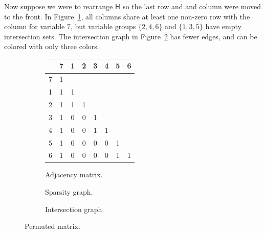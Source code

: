 \documentclass[article]{jss}\usepackage[]{graphicx}\usepackage[]{color}
\newcommand{\hess}[2]{\mathsf{H}_{#1}#2}
\begin{document}
Now suppose we were to rearrange $\hess{}{}$ so the last row and
and column were moved to the front.  In Figure~\ref{fig:graph2adj}, all columns share at least one non-zero row with
the column for variable 7, but variable groups $\{2,4,6\}$ and
$\{1,3,5\}$ have empty intersection sets.  The intersection graph in
Figure~\ref{fig:graph2pic} has fewer edges, and can be colored
with only three colors.
\begin{figure}[ptb]
  \begin{subfigure}[m]{.32\textwidth}\centering
  \begin{tabular}{r|ccccccc}
   & 7&1&2&3&4&5&6\\
    \hline
    7& 1&&&&&&\\
    1&1&1&&&&&\\
    2&1&1&1&&&&\\
    3&1&0&0&1&&&\\
    4&1&0&0&1&1&&\\
    5&1&0&0&0&0&1&\\
    6&1&0&0&0&0&1&1
  \end{tabular}
  \caption{Adjacency matrix.}\label{fig:graph2adj}
\end{subfigure}
\begin{subfigure}[m]{.32\textwidth}\centering
\iftoggle{tikz}{
\begin{tikzpicture}
\tikzstyle{every node}=[draw, shape=circle]
\node at (0,0) [fill=green!20] (v7) {7};
\node at (0:1) [fill=blue!20] (v1) {1};
\node at (60:1) [fill=red!20] (v2) {2};
\node at (120:1) [fill=blue!20] (v3) {3};
\node at (180:1) [fill=red!20] (v4) {4};
\node at (240:1) [fill=blue!20] (v5) {5};
\node at (300:1) [fill=red!20] (v6) {6};
\draw
(v1) -- (v7)  (v2) -- (v7)  (v3) -- (v7)
(v4) -- (v7)  (v5) -- (v7)  (v6) -- (v7)
(v1) -- (v2)  (v3) -- (v4)  (v5) -- (v6);
\end{tikzpicture}
}{} %
\caption{Sparsity graph.}\label{fig:graph2pic}
\end{subfigure}
\begin{subfigure}[m]{.32\textwidth}\centering
\iftoggle{tikz}{
\begin{tikzpicture}
\tikzstyle{every node}=[draw, shape=circle]
\node at (0,0) [fill=green!20] (v7) {7};
\node at (0:1) [fill=blue!20] (v1) {1};
\node at (60:1) [fill=red!20] (v2) {2};
\node at (120:1) [fill=blue!20] (v3) {3};
\node at (180:1) [fill=red!20] (v4) {4};
\node at (240:1) [fill=blue!20] (v5) {5};
\node at (300:1) [fill=red!20] (v6) {6};
\draw
(v1) -- (v7)  (v2) -- (v7)  (v3) -- (v7)
(v4) -- (v7)  (v5) -- (v7)  (v6) -- (v7)
(v1) -- (v2)  (v3) -- (v4)  (v5) -- (v6);
\end{tikzpicture}
}{} %
\caption{Intersection graph.}\label{fig:graph2int}
\end{subfigure}
\caption{Permuted matrix.}\label{fig:graph2}
\end{figure}
\end{document}
